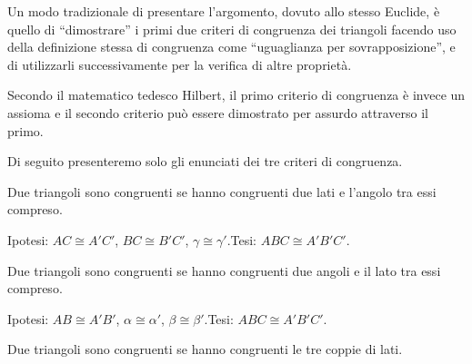 Un modo tradizionale di presentare l'argomento, dovuto allo stesso 
Euclide, è quello di ``dimostrare'' i primi due criteri di congruenza 
dei triangoli facendo uso della definizione stessa di congruenza come 
``uguaglianza per sovrapposizione'', e di utilizzarli successivamente 
per la verifica di altre proprietà.

Secondo il matematico tedesco Hilbert, il primo criterio di 
congruenza è invece un assioma e il secondo criterio può essere 
dimostrato per assurdo attraverso il primo. 

Di seguito presenteremo solo gli enunciati dei tre criteri di congruenza.

\begin{teorema}
Due triangoli sono congruenti se hanno congruenti due lati e l'angolo 
tra essi compreso.
\end{teorema}


\begin{inaccessibleblock}
 \begin{figure}[htb]
\centering
\end{figure}
\end{inaccessibleblock}

\noindent Ipotesi: \(AC\cong A'C'\), \(BC\cong B'C'\), \(\gamma \cong 
\gamma'\).\tab Tesi:  \(ABC \cong A'B'C'\).

\begin{teorema}
Due triangoli sono congruenti se hanno congruenti due angoli e il 
lato tra essi compreso.
\end{teorema}


\begin{inaccessibleblock}
 \begin{figure}[htb]
\centering
\end{figure}
\end{inaccessibleblock}

\noindent Ipotesi: \(AB\cong A'B'\), \(\alpha\cong \alpha'\), \(\beta 
\cong \beta'\).\tab Tesi:  \(ABC \cong A'B'C'\).

\begin{teorema}
  Due triangoli sono congruenti se hanno congruenti le tre coppie di 
  lati.
\end{teorema}


